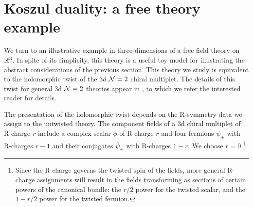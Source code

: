 \documentclass[11pt]{amsart}
\def\brian#1{{\textcolor{blue!65!red}{BRW: {#1}}}}
\begin{document}


\section{Koszul duality: a free theory example}\label{s:free}


We turn to an illustrative example in three-dimensions of a free field theory on $\mathbb R^3$. In spite of its simplicity, this theory is a useful toy model for illustrating the abstract considerations of the previous section. 
This theory we study is equivalent to the holomorphic twist of the $3d$ $\mathcal N=2$ chiral multiplet. The details of this twist for general 3d $\mathcal N=2$ theories appear in \cite{CDG, ACNV, ESW}, to which we refer the interested reader for details. 

The presentation of the holomorphic twist depends on the R-symmetry data we assign to the untwisted theory. 
The component fields of a 3d chiral multiplet of R-charge $r$ include a complex scalar $\phi$ of R-charge $r$ and four fermions $\psi_{\pm}$ with R-charges  $r-1$ and their conjugates $\bar{\psi}_{\pm}$ with R-charges $1-r$. We choose $r=0$ \footnote{Since the R-charge governs the twisted spin of the fields, more general R-charge assignments will result in the fields transforming as sections of certain powers of the canonical bundle: the $r/2$ power for the twisted scalar, and the $1-r/2$ power for the twisted fermion.}.  
\end{document}
